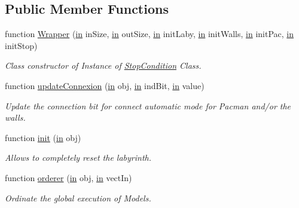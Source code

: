 \subsection*{Public Member Functions}
\begin{DoxyCompactItemize}
\item 
function \hyperlink{class_wrapper_ab0ebf6c7738beb446d13d2d9445fbc8a}{Wrapper} (\hyperlink{class_wrapper_a5e252d97ca5bf85c5753e2914673eead}{in} in\+Size, \hyperlink{class_wrapper_a5e252d97ca5bf85c5753e2914673eead}{in} out\+Size, \hyperlink{class_wrapper_a5e252d97ca5bf85c5753e2914673eead}{in} init\+Laby, \hyperlink{class_wrapper_a5e252d97ca5bf85c5753e2914673eead}{in} init\+Walls, \hyperlink{class_wrapper_a5e252d97ca5bf85c5753e2914673eead}{in} init\+Pac, \hyperlink{class_wrapper_a5e252d97ca5bf85c5753e2914673eead}{in} init\+Stop)
\begin{DoxyCompactList}\small\item\em Class constructor of Instance of \hyperlink{class_stop_condition}{Stop\+Condition} Class. \end{DoxyCompactList}\item 
function \hyperlink{class_wrapper_aa41b9b215897635f48e1c8a4eaca7640}{update\+Connexion} (\hyperlink{class_wrapper_a5e252d97ca5bf85c5753e2914673eead}{in} obj, \hyperlink{class_wrapper_a5e252d97ca5bf85c5753e2914673eead}{in} ind\+Bit, \hyperlink{class_wrapper_a5e252d97ca5bf85c5753e2914673eead}{in} value)
\begin{DoxyCompactList}\small\item\em Update the connection bit for connect automatic mode for Pacman and/or the walls. \end{DoxyCompactList}\item 
function \hyperlink{class_wrapper_a7d486dd79e7c7bc857ffaa4e273d27c5}{init} (\hyperlink{class_wrapper_a5e252d97ca5bf85c5753e2914673eead}{in} obj)
\begin{DoxyCompactList}\small\item\em Allows to completely reset the labyrinth. \end{DoxyCompactList}\item 
function \hyperlink{class_wrapper_a9c889c73b9d4b80dde64dfe385ed747e}{orderer} (\hyperlink{class_wrapper_a5e252d97ca5bf85c5753e2914673eead}{in} obj, \hyperlink{class_wrapper_a5e252d97ca5bf85c5753e2914673eead}{in} vect\+In)
\begin{DoxyCompactList}\small\item\em Ordinate the global execution of Models. \end{DoxyCompactList}\item 

\end{DoxyCompactItemize}
